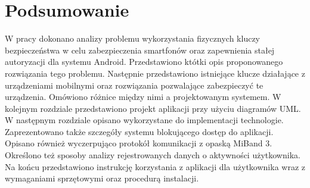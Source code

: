\chapter{Podsumowanie}
\thispagestyle{chapterBeginStyle}
W pracy dokonano analizy problemu wykorzystania fizycznych kluczy bezpieczeństwa w celu zabezpieczenia smartfonów oraz zapewnienia stałej autoryzacji dla systemu Android. Przedstawiono któtki opis proponowanego rozwiązania tego problemu. Następnie przedstawiono istniejące klucze działające z urządzeniami mobilnymi oraz rozwiązania pozwalające zabezpieczyć te urządzenia. Omówiono różnice między nimi a projektowanym systemem. W kolejnym rozdziale przedstawiono projekt aplikacji przy użyciu diagramów UML. W następnym rozdziale opisano wykorzystane do implementacji technologie. Zaprezentowano także szczegóły systemu blokującego dostęp do aplikacji. Opisano również wyczerpująco protokół komunikacji z opaską MiBand 3. Określono też sposoby analizy rejestrowanych danych o aktywności użytkownika. Na końcu przedstawiono instrukcję korzystania z aplikacji dla użytkownika wraz z wymaganiami sprzętowymi oraz procedurą instalacji. 
